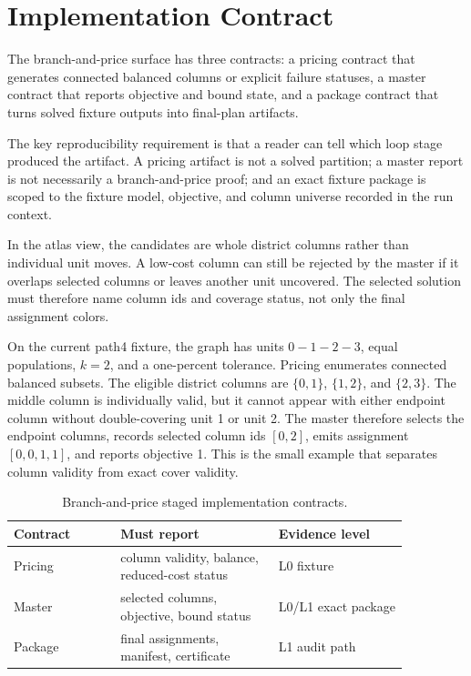 \section{Implementation Contract}

The branch-and-price surface has three contracts: a pricing contract that
generates connected balanced columns or explicit failure statuses, a master
contract that reports objective and bound state, and a package contract that
turns solved fixture outputs into final-plan artifacts.

The key reproducibility requirement is that a reader can tell which loop stage
produced the artifact. A pricing artifact is not a solved partition; a master
report is not necessarily a branch-and-price proof; and an exact fixture
package is scoped to the fixture model, objective, and column universe recorded
in the run context.

In the atlas view, the candidates are whole district columns rather than
individual unit moves. A low-cost column can still be rejected by the master if
it overlaps selected columns or leaves another unit uncovered. The selected
solution must therefore name column ids and coverage status, not only the final
assignment colors.

On the current path4 fixture, the graph has units \(0-1-2-3\), equal
populations, \(k=2\), and a one-percent tolerance. Pricing enumerates connected
balanced subsets. The eligible district columns are \(\{0,1\}\), \(\{1,2\}\),
and \(\{2,3\}\). The middle column is individually valid, but it cannot appear
with either endpoint column without double-covering unit 1 or unit 2. The
master therefore selects the endpoint columns, records selected column ids
\([0,2]\), emits assignment \([0,0,1,1]\), and reports objective 1. This is the
small example that separates column validity from exact cover validity.

\begin{table}[htbp]
\centering
\small
\begin{tabular}{p{0.23\linewidth}p{0.34\linewidth}p{0.29\linewidth}}
\toprule
Contract & Must report & Evidence level \\
\midrule
Pricing & column validity, balance, reduced-cost status & L0 fixture \\
Master & selected columns, objective, bound status & L0/L1 exact package \\
Package & final assignments, manifest, certificate & L1 audit path \\
\bottomrule
\end{tabular}
\caption{Branch-and-price staged implementation contracts.}
\end{table}

